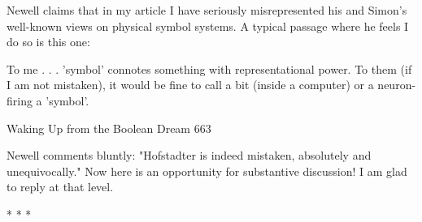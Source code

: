        Newell claims that in my article I have seriously misrepresented his and
Simon's well-known views on physical symbol systems. A typical passage where he
feels I do so is this one:

   To me . . . 'symbol' connotes something with representational power. To them
   (if I am not mistaken), it would be fine to call a bit (inside a computer) or a
   neuron-firing a 'symbol'.




Waking Up from the Boolean Dream                                                       663

Newell comments bluntly: "Hofstadter is indeed mistaken, absolutely and
unequivocally." Now here is an opportunity for substantive discussion! I am glad to
reply at that level.

                                        *   *   *

